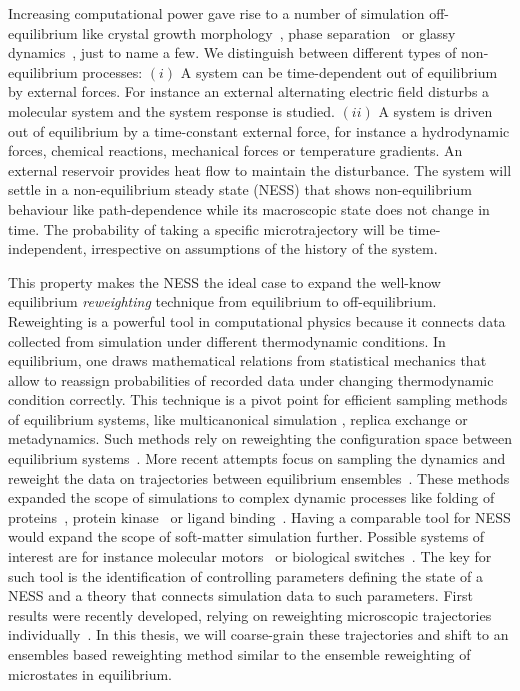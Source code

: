 Increasing computational power gave rise to a number of simulation off-equilibrium like crystal growth morphology~\cite{radu2017enhanced,lander2013crystallization}, phase separation~\cite{smrek2017small} or glassy dynamics~\cite{kawamura1998dynamical}, just to name a few. We distinguish between different types of non-equilibrium processes: $(i)$ A system can be time-dependent out of equilibrium by external forces. For instance an external alternating electric field disturbs a molecular system and the system response is studied.  $(ii)$ A system is driven out of equilibrium by a time-constant external force, for instance a hydrodynamic forces, chemical reactions, mechanical forces or temperature gradients. An external reservoir provides heat flow to maintain the disturbance. The system will settle in a non-equilibrium steady state (NESS) that shows non-equilibrium behaviour like path-dependence while its macroscopic state does not change in time. The probability of taking a specific microtrajectory will be time-independent, irrespective on assumptions of the history of the system.


This property makes the NESS the ideal case to expand the well-know equilibrium  \textit{reweighting} technique from  equilibrium to off-equilibrium. Reweighting is a powerful tool in computational physics because it connects data collected from simulation under different thermodynamic conditions. In equilibrium, one draws  mathematical relations from statistical mechanics that allow to reassign probabilities of recorded data under changing thermodynamic condition correctly. This technique is a pivot point for efficient sampling methods of equilibrium systems, like multicanonical simulation \cite{janke1998multicanonical}, replica exchange \cite{sugita1999replica} or metadynamics\cite{laio2002escaping}. Such methods rely on reweighting the configuration space between equilibrium systems~\cite{kumar1995multidimensional,schafer2020data,shirts2008statistically}. More recent attempts focus on sampling the dynamics and reweight the data on trajectories between equilibrium ensembles~\cite{wu2014statistically,wan2016maximum, wu2016multiensemble}. These methods expanded the scope of simulations to complex dynamic processes like folding of proteins~\cite{voelz2010molecular}, protein kinase~\cite{yang2008src} or ligand binding~\cite{plattner2015protein}. Having a comparable tool for NESS would expand the scope of soft-matter simulation further. Possible systems of interest are for instance molecular motors~\cite{schliwa2003molecular} or biological switches~\cite{goldbeter1997biochemical}. The key for such tool is the identification of controlling parameters defining the state of a NESS and a theory that connects simulation data to such parameters. First results were recently developed, relying on reweighting microscopic trajectories individually~\cite{donati2017girsanov,russo2020iterative}. In this thesis, we will coarse-grain these trajectories and shift to an ensembles based reweighting method similar to the ensemble reweighting of microstates in equilibrium. 

